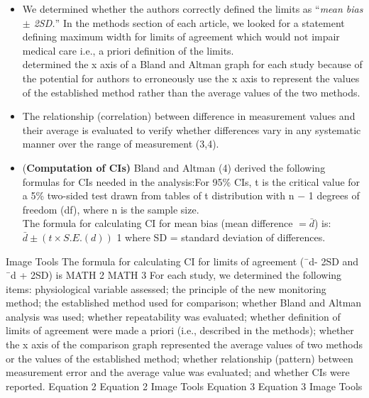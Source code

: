 \documentclass[]{article}
\begin{document}
\begin{itemize}
		\item We determined whether the authors correctly defined the limits as “\textit{mean bias $\pm$ 2SD.}” In the methods section of each article, we looked for a statement defining maximum width for limits of agreement which would not impair medical care i.e., a priori definition of the limits. \\  determined the x axis of a Bland and Altman graph for each study because of the potential for authors to erroneously use the x axis to represent the values of the established method rather than the average values of the two methods. 
		
		\item The relationship (correlation) between difference in measurement values and their average is evaluated to verify whether differences vary in any systematic manner over the range of measurement (3,4).
		\item (\textbf{Computation of CIs)} Bland and Altman (4) derived the following formulas for CIs needed in the analysis:For 95\% CIs, t is the critical value for a 5\% two-sided test drawn from tables of t distribution with n − 1 degrees of freedom (df), where n is the sample size. \\ The formula for calculating CI for mean bias (mean difference $=\bar{d}$) is:$\bar{d} \pm (t \times S.E.(d))$ 1 where SD = standard deviation of differences.
	\end{itemize}
	Image Tools
	The formula for calculating CI for limits of agreement (¯d- 2SD and ¯d + 2SD) is MATH 2 MATH 3 For each study, we determined the following items: physiological variable assessed; the principle of the new monitoring method; the established method used for comparison; whether Bland and Altman analysis was used; whether repeatability was evaluated; whether definition of limits of agreement were made a priori (i.e., described in the methods); whether the x axis of the comparison graph represented the average values of two methods or the values of the established method; whether relationship (pattern) between measurement error and the average value was evaluated; and whether CIs were reported.
	Equation 2
	Equation 2
	Image Tools	Equation 3
	Equation 3
	Image Tools
	\newpage
\end{document}
